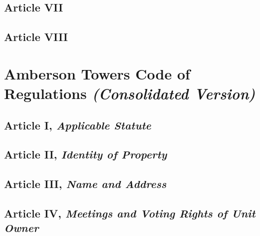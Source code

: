 \documentclass[
]{book}
\begin{document}
\hypertarget{article-vii}{%
\section*{Article VII}\label{article-vii}}

\hypertarget{article-viii}{%
\section*{Article VIII}\label{article-viii}}

\hypertarget{amberson-towers-code-of-regulations-consolidated-version}{%
\chapter{\texorpdfstring{Amberson Towers Code of Regulations \emph{(Consolidated Version)}}{Amberson Towers Code of Regulations   (Consolidated Version)}}\label{amberson-towers-code-of-regulations-consolidated-version}}

\hypertarget{article-i-applicable-statute}{%
\section*{\texorpdfstring{Article I, \emph{Applicable Statute}}{Article I, Applicable Statute}}\label{article-i-applicable-statute}}

\hypertarget{article-ii-identity-of-property}{%
\section*{\texorpdfstring{Article II, \emph{Identity of Property}}{Article II, Identity of Property}}\label{article-ii-identity-of-property}}

\hypertarget{article-iii-name-and-address}{%
\section*{\texorpdfstring{Article III, \emph{Name and Address}}{Article III, Name and Address}}\label{article-iii-name-and-address}}

\hypertarget{article-iv-meetings-and-voting-rights-of-unit-owner}{%
\section*{\texorpdfstring{Article IV, \emph{Meetings and Voting Rights of Unit Owner}}{Article IV, Meetings and Voting Rights of Unit Owner}}\label{article-iv-meetings-and-voting-rights-of-unit-owner}}
\end{document}
